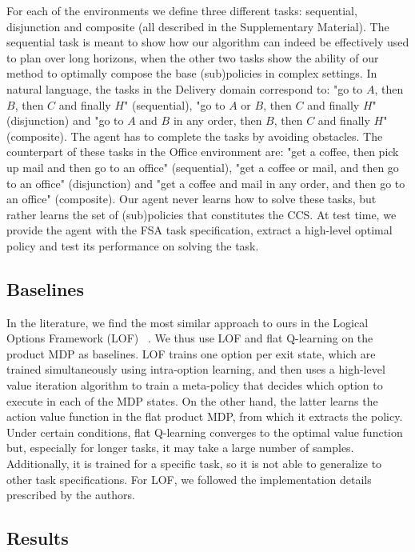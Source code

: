 For each of the environments we define three different tasks: sequential, disjunction and composite (all described in the Supplementary Material). The sequential task is meant to show how our algorithm can indeed be effectively used to plan over long horizons, when the other two tasks show the ability of our method to optimally compose the base (sub)policies in complex settings. In natural language, the tasks in the Delivery domain correspond to: "go to $A$, then $B$, then $C$ and finally $H$"  (sequential), "go to $A$ or $B$, then $C$ and finally $H$" (disjunction) and "go to $A$ and $B$ in any order, then $B$, then $C$ and finally $H$" (composite). The agent has to complete the tasks by avoiding obstacles. The counterpart of these tasks in the Office environment are: "get a coffee, then pick up mail and then go to an office" (sequential), "get a coffee or mail, and then go to an office" (disjunction) and "get a coffee and mail in any order, and then go to an office" (composite). 
Our agent never learns how to solve these tasks, but rather learns the set of (sub)policies that constitutes the CCS. At test time, we provide the agent with the FSA task specification, extract a high-level optimal policy and test its performance on solving the task.

\subsection{Baselines} In the literature, we find the most similar approach to ours in the Logical Options Framework (LOF) ~\citep{Araki2021}. We thus use LOF and flat Q-learning on the product MDP as baselines. LOF trains one option per exit state, which are trained simultaneously using intra-option learning, and then uses a high-level value iteration algorithm to train a meta-policy that decides which option to execute in each of the MDP states. On the other hand, the latter learns the action value function in the flat product MDP, from which it extracts the policy. Under certain conditions, flat Q-learning converges to the optimal value function but, especially for longer tasks, it may take a large number of samples. Additionally, it is trained for a specific task, so it is not able to generalize to other task specifications. For LOF, we followed the implementation details prescribed by the authors. 

\subsection{Results}
